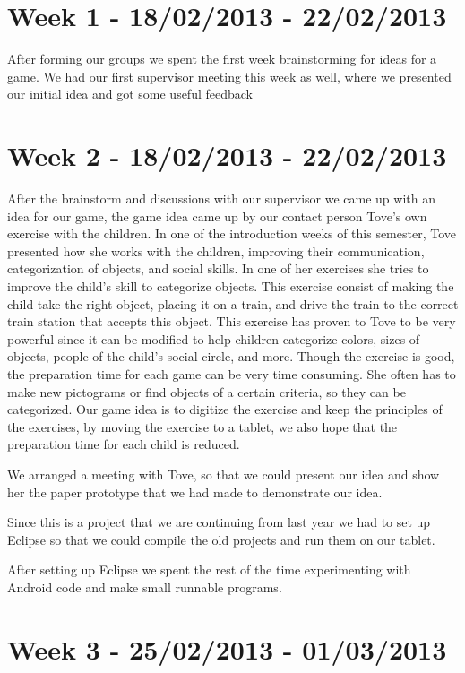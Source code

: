 \section*{Week 1 - 18/02/2013 - 22/02/2013}

After forming our groups we spent the first week brainstorming for ideas for a game. We had our first supervisor meeting this week as well, where we presented our initial idea and got some useful feedback

\section*{Week 2 - 18/02/2013 - 22/02/2013} 
\label{processweek2}
After the brainstorm and discussions with our supervisor we came up with an idea for our game, the game idea came up by our contact person Tove's own exercise with the children. In one of the introduction weeks of this semester, Tove presented how she works with the children, improving their communication, categorization of objects, and social skills. In one of her exercises she tries to improve the child's skill to categorize objects. This exercise consist of making the child take the right object, placing it on a train, and drive the train to the correct train station that accepts this object. This exercise has proven to Tove to be very powerful since it can be modified to help children categorize colors, sizes of objects, people of the child's social circle, and more. Though the exercise is good, the preparation time for each game can be very time consuming. She often has to make new pictograms or find objects of a certain criteria, so they can be categorized. Our game idea is to digitize the exercise and keep the principles of the exercises, by moving the exercise to a tablet, we also hope that the preparation time for each child is reduced.

We arranged a meeting with Tove, so that we could present our idea and show her the paper prototype that we had made to demonstrate our idea.%

Since this is a project that we are continuing from last year we had to set up Eclipse so that we could compile the old projects and run them on our tablet. 

After setting up Eclipse we spent the rest of the time experimenting with Android code and make small runnable programs. 

\section*{Week 3 - 25/02/2013 - 01/03/2013}

